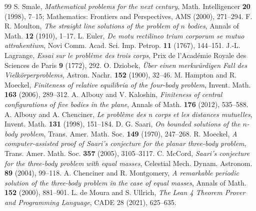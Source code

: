 \documentclass[11pt,a4paper]{article}
\theoremstyle{definition}
\begin{document}
\begin{thebibliography}{99}
 S. Smale, \textit{Mathematical problems for the next century}, Math. Intelligencer \textbf{20} (1998), 7--15; Mathematics: Frontiers and Perspectives, AMS (2000), 271--294.
 F. R. Moulton, \textit{The straight line solutions of the problem of $n$ bodies}, Annals of Math. \textbf{12} (1910), 1--17.
 L. Euler, \textit{De motu rectilineo trium corporum se mutuo attrahentium}, Novi Comm. Acad. Sci. Imp. Petrop. \textbf{11} (1767), 144--151.
 J.-L. Lagrange, \textit{Essai sur le problème des trois corps}, Prix de l'Académie Royale des Sciences de Paris \textbf{9} (1772), 292.
 O. Dziobek, \textit{Über einen merkwürdigen Fall des Vielkörperproblems}, Astron. Nachr. \textbf{152} (1900), 32--46.
 M. Hampton and R. Moeckel, \textit{Finiteness of relative equilibria of the four-body problem}, Invent. Math. \textbf{163} (2006), 289--312.
 A. Albouy and V. Kaloshin, \textit{Finiteness of central configurations of five bodies in the plane}, Annals of Math. \textbf{176} (2012), 535--588.
 A. Albouy and A. Chenciner, \textit{Le problème des n corps et les distances mutuelles}, Invent. Math. \textbf{131} (1998), 151--184.
 D. G. Saari, \textit{On bounded solutions of the $n$-body problem}, Trans. Amer. Math. Soc. \textbf{149} (1970), 247--268.
 R. Moeckel, \textit{A computer-assisted proof of Saari's conjecture for the planar three-body problem}, Trans. Amer. Math. Soc. \textbf{357} (2005), 3105--3117.
 C. McCord, \textit{Saari's conjecture for the three-body problem with equal masses}, Celestial Mech. Dynam. Astronom. \textbf{89} (2004), 99--118.
 A. Chenciner and R. Montgomery, \textit{A remarkable periodic solution of the three-body problem in the case of equal masses}, Annals of Math. \textbf{152} (2000), 881--901.
 L. de Moura and S. Ullrich, \textit{The Lean 4 Theorem Prover and Programming Language}, CADE 28 (2021), 625--635.
\end{thebibliography}
\end{document}
